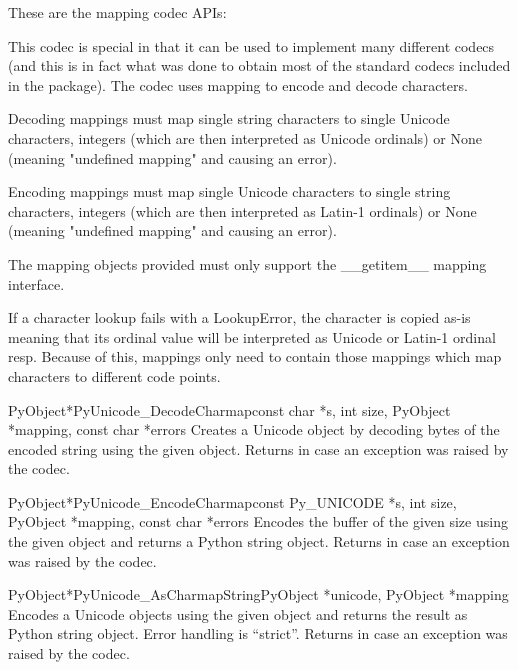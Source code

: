 \documentclass{manual}
\begin{document}
These are the mapping codec APIs:

This codec is special in that it can be used to implement many
different codecs (and this is in fact what was done to obtain most of
the standard codecs included in the  package). The
codec uses mapping to encode and decode characters.

Decoding mappings must map single string characters to single Unicode
characters, integers (which are then interpreted as Unicode ordinals)
or None (meaning "undefined mapping" and causing an error). 

Encoding mappings must map single Unicode characters to single string
characters, integers (which are then interpreted as Latin-1 ordinals)
or None (meaning "undefined mapping" and causing an error).

The mapping objects provided must only support the __getitem__ mapping
interface.

If a character lookup fails with a LookupError, the character is
copied as-is meaning that its ordinal value will be interpreted as
Unicode or Latin-1 ordinal resp. Because of this, mappings only need
to contain those mappings which map characters to different code
points.

\begin{cfuncdesc}{PyObject*}{PyUnicode_DecodeCharmap}{const char *s,
                                               int size,
                                               PyObject *mapping,
                                               const char *errors}
Creates a Unicode object by decoding  bytes of the encoded
string  using the given  object.  Returns \NULL{}
in case an exception was raised by the codec.
\end{cfuncdesc}

\begin{cfuncdesc}{PyObject*}{PyUnicode_EncodeCharmap}{const Py_UNICODE *s,
                                               int size,
                                               PyObject *mapping,
                                               const char *errors}
Encodes the  buffer of the given size using the
given  object and returns a Python string object.
Returns \NULL{} in case an exception was raised by the codec.
\end{cfuncdesc}

\begin{cfuncdesc}{PyObject*}{PyUnicode_AsCharmapString}{PyObject *unicode,
                                                        PyObject *mapping}
Encodes a Unicode objects using the given  object and
returns the result as Python string object. Error handling is
``strict''. Returns \NULL{} in case an exception was raised by the
codec.
\end{cfuncdesc}
\end{document}
